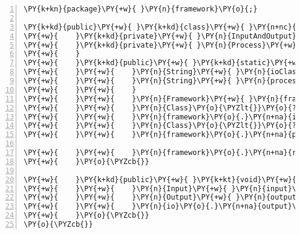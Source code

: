 \begin{Verbatim}[commandchars=\\\{\},numbers=left,firstnumber=1,stepnumber=1,frame=single,fontsize=\small]
\PY{k+kn}{package}\PY{+w}{ }\PY{n}{framework}\PY{o}{;}

\PY{k+kd}{public}\PY{+w}{ }\PY{k+kd}{class}\PY{+w}{ }\PY{n+nc}{Framework}\PY{+w}{ }\PY{o}{\PYZob{}}
\PY{+w}{    }\PY{k+kd}{private}\PY{+w}{ }\PY{n}{InputAndOutput}\PY{+w}{ }\PY{n}{io}\PY{o}{;}
\PY{+w}{    }\PY{k+kd}{private}\PY{+w}{ }\PY{n}{Process}\PY{+w}{ }\PY{n}{process}\PY{o}{;}
\PY{+w}{    }
\PY{+w}{    }\PY{k+kd}{public}\PY{+w}{ }\PY{k+kd}{static}\PY{+w}{ }\PY{k+kt}{void}\PY{+w}{ }\PY{n+nf}{main}\PY{o}{(}\PY{n}{String}\PY{o}{[}\PY{o}{]}\PY{+w}{ }\PY{n}{args}\PY{o}{)}\PY{+w}{ }\PY{k+kd}{throws}\PY{+w}{ }\PY{n}{Exception}\PY{+w}{ }\PY{o}{\PYZob{}}
\PY{+w}{    }\PY{+w}{    }\PY{n}{String}\PY{+w}{ }\PY{n}{ioClass}\PY{+w}{ }\PY{o}{=}\PY{+w}{ }\PY{n}{args}\PY{o}{[}\PY{l+m+mi}{0}\PY{o}{]}\PY{o}{;}
\PY{+w}{    }\PY{+w}{    }\PY{n}{String}\PY{+w}{ }\PY{n}{processClass}\PY{+w}{ }\PY{o}{=}\PY{+w}{ }\PY{n}{args}\PY{o}{[}\PY{l+m+mi}{1}\PY{o}{]}\PY{o}{;}
\PY{+w}{    }\PY{+w}{    }
\PY{+w}{    }\PY{+w}{    }\PY{n}{Framework}\PY{+w}{ }\PY{n}{framework}\PY{+w}{ }\PY{o}{=}\PY{+w}{ }\PY{k}{new}\PY{+w}{ }\PY{n}{Framework}\PY{o}{(}\PY{o}{)}\PY{o}{;}
\PY{+w}{    }\PY{+w}{    }\PY{n}{Class}\PY{o}{\PYZlt{}}\PY{o}{?}\PY{o}{\PYZgt{}}\PY{+w}{ }\PY{n}{io}\PY{+w}{ }\PY{o}{=}\PY{+w}{ }\PY{n}{Class}\PY{o}{.}\PY{n+na}{forName}\PY{o}{(}\PY{n}{ioClass}\PY{o}{)}\PY{o}{;}
\PY{+w}{    }\PY{+w}{    }\PY{n}{framework}\PY{o}{.}\PY{n+na}{io}\PY{+w}{ }\PY{o}{=}\PY{+w}{ }\PY{o}{(}\PY{n}{InputAndOutput}\PY{o}{)}\PY{+w}{ }\PY{n}{io}\PY{o}{.}\PY{n+na}{newInstance}\PY{o}{(}\PY{o}{)}\PY{o}{;}
\PY{+w}{    }\PY{+w}{    }\PY{n}{Class}\PY{o}{\PYZlt{}}\PY{o}{?}\PY{o}{\PYZgt{}}\PY{+w}{ }\PY{n}{process}\PY{+w}{ }\PY{o}{=}\PY{+w}{ }\PY{n}{Class}\PY{o}{.}\PY{n+na}{forName}\PY{o}{(}\PY{n}{processClass}\PY{o}{)}\PY{o}{;}
\PY{+w}{    }\PY{+w}{    }\PY{n}{framework}\PY{o}{.}\PY{n+na}{process}\PY{+w}{ }\PY{o}{=}\PY{+w}{ }\PY{o}{(}\PY{n}{Process}\PY{o}{)}\PY{+w}{ }\PY{n}{process}\PY{o}{.}\PY{n+na}{newInstance}\PY{o}{(}\PY{o}{)}\PY{o}{;}

\PY{+w}{    }\PY{+w}{    }\PY{n}{framework}\PY{o}{.}\PY{n+na}{run}\PY{o}{(}\PY{o}{)}\PY{o}{;}
\PY{+w}{    }\PY{o}{\PYZcb{}}

\PY{+w}{    }\PY{k+kd}{public}\PY{+w}{ }\PY{k+kt}{void}\PY{+w}{ }\PY{n+nf}{run}\PY{o}{(}\PY{o}{)}\PY{+w}{ }\PY{k+kd}{throws}\PY{+w}{ }\PY{n}{Exception}\PY{+w}{ }\PY{o}{\PYZob{}}
\PY{+w}{    }\PY{+w}{    }\PY{n}{Input}\PY{+w}{ }\PY{n}{input}\PY{+w}{ }\PY{o}{=}\PY{+w}{ }\PY{n}{io}\PY{o}{.}\PY{n+na}{input}\PY{o}{(}\PY{o}{)}\PY{o}{;}
\PY{+w}{    }\PY{+w}{    }\PY{n}{Output}\PY{+w}{ }\PY{n}{output}\PY{+w}{ }\PY{o}{=}\PY{+w}{ }\PY{n}{process}\PY{o}{.}\PY{n+na}{process}\PY{o}{(}\PY{n}{input}\PY{o}{)}\PY{o}{;}
\PY{+w}{    }\PY{+w}{    }\PY{n}{io}\PY{o}{.}\PY{n+na}{output}\PY{o}{(}\PY{n}{output}\PY{o}{)}\PY{o}{;}
\PY{+w}{    }\PY{o}{\PYZcb{}}
\PY{o}{\PYZcb{}}
\end{Verbatim}
